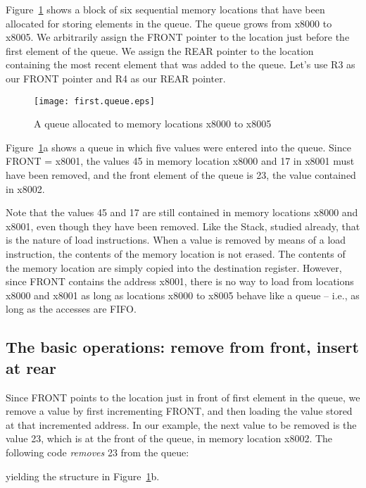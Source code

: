 \documentclass{patt}
\begin{document}
Figure~\ref{fig:first.queue} shows a block of six sequential memory locations 
that have been
allocated for storing elements in the queue.  The queue grows from x8000 to 
x8005.  We arbitrarily assign the FRONT pointer to the location just before 
the first element of the queue.  We assign the REAR pointer to the location 
containing the most recent element that was added to the queue.  Let's use R3 
as our FRONT pointer and R4 as our REAR pointer.  

\begin{figure}[h]
\centerline{\texttt{[image: first.queue.eps]}}
\caption{A queue allocated to memory locations x8000 to x8005}
\label{fig:first.queue}
\end{figure}

\FloatBarrier
Figure~\ref{fig:first.queue}a shows a queue in which five values were entered 
into the queue.  Since FRONT = x8001, the values 45 in memory location x8000 
and 17 in x8001 must have been removed, and the front element of the queue 
is 23, the value contained in x8002.   

Note that the values 45 and 17 are still contained in memory locations x8000 
and x8001, even though they have been removed.  Like the Stack, studied 
already, that is the nature of load instructions.  When a value is removed by 
means of a load instruction, the contents of the memory location is not erased.
The contents of the memory location are simply copied into the destination 
register.  However,  since FRONT contains the address x8001, there is no way 
to load from locations x8000 and x8001 as long as locations x8000 to x8005 
behave like a queue -- i.e., as long as the accesses are FIFO.  

\subsection{The basic operations: remove from front, insert at rear}

Since FRONT points to the location just in front of first element in the 
queue, we remove a value by first incrementing FRONT, and then loading the
value stored at that incremented address.  In our example, the next value to 
be removed is the value 23, which is at the front of the queue, in memory 
location x8002.  The following code {\em removes} 23 from the queue:

\noindent
yielding the structure in Figure~\ref{fig:first.queue}b.
\end{document}

